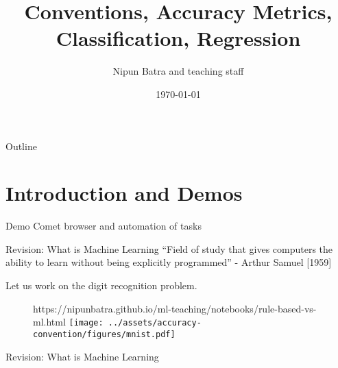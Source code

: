\documentclass[usenames,dvipsnames]{beamer}
\title{Conventions, Accuracy Metrics, Classification, Regression}
\date{\today}
\author{Nipun Batra and teaching staff}
\institute{IIT Gandhinagar}
\begin{document}
  \setcounter{popquiz}{0}

  \maketitle
  
  \begin{frame}{Outline}
    \tableofcontents
  \end{frame}
  
    \section{Introduction and Demos}
  
  \begin{frame}{Demo}
	Comet browser and automation of tasks
  \end{frame}
  

 
  \begin{frame}{Revision: What is Machine Learning}
	 ``Field of study that gives computers the ability to learn
		without being explicitly programmed'' - Arthur Samuel
		[1959]

		\pause Let us work on the digit recognition problem.

		\begin{figure}[htp]
			\centering
			\begin{notebookbox}{https://nipunbatra.github.io/ml-teaching/notebooks/rule-based-vs-ml.html}
			  \texttt{[image: ../assets/accuracy-convention/figures/mnist.pdf]}
			\end{notebookbox}
		  \end{figure}
	\end{frame}
		
	

\begin{frame}{Revision: What is Machine Learning}
\end{frame}	
  
\end{document}
